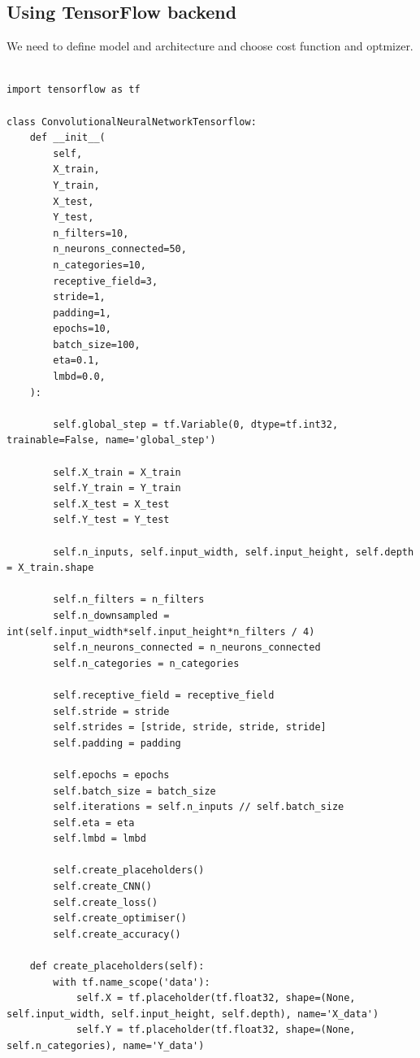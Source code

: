 \documentclass[%
oneside,                 %
final,                   %
10pt]{article}
\begin{document}
\subsection*{Using TensorFlow backend}

We need to define model and architecture and choose cost function and optmizer.
\begin{Verbatim}[numbers=none,fontsize=\fontsize{9pt}{9pt},baselinestretch=0.95]

import tensorflow as tf

class ConvolutionalNeuralNetworkTensorflow:
    def __init__(
        self,
        X_train,
        Y_train,
        X_test,
        Y_test,
        n_filters=10,
        n_neurons_connected=50,
        n_categories=10,
        receptive_field=3,
        stride=1,
        padding=1,
        epochs=10,
        batch_size=100,
        eta=0.1,
        lmbd=0.0,
    ):
        
        self.global_step = tf.Variable(0, dtype=tf.int32, trainable=False, name='global_step')
        
        self.X_train = X_train
        self.Y_train = Y_train
        self.X_test = X_test
        self.Y_test = Y_test
        
        self.n_inputs, self.input_width, self.input_height, self.depth = X_train.shape
        
        self.n_filters = n_filters
        self.n_downsampled = int(self.input_width*self.input_height*n_filters / 4)
        self.n_neurons_connected = n_neurons_connected
        self.n_categories = n_categories
        
        self.receptive_field = receptive_field
        self.stride = stride
        self.strides = [stride, stride, stride, stride]
        self.padding = padding
        
        self.epochs = epochs
        self.batch_size = batch_size
        self.iterations = self.n_inputs // self.batch_size
        self.eta = eta
        self.lmbd = lmbd
        
        self.create_placeholders()
        self.create_CNN()
        self.create_loss()
        self.create_optimiser()
        self.create_accuracy()
    
    def create_placeholders(self):
        with tf.name_scope('data'):
            self.X = tf.placeholder(tf.float32, shape=(None, self.input_width, self.input_height, self.depth), name='X_data')
            self.Y = tf.placeholder(tf.float32, shape=(None, self.n_categories), name='Y_data')
    

\end{Verbatim}
\end{document}
